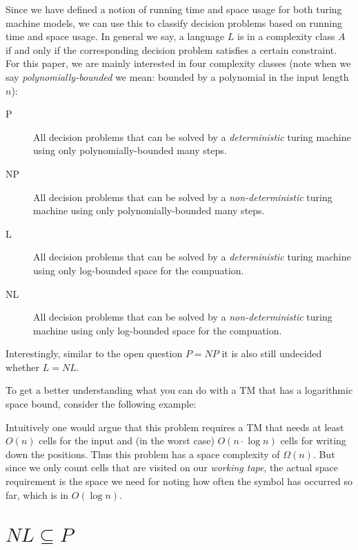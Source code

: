 Since we have defined a notion of running time and space usage for both
turing machine models, we can use this to classify decision problems
based on running time and space usage. In general we say, a language $L$
is in a complexity class $A$ if and only if the corresponding decision
problem satisfies a certain constraint. For this paper, we are mainly
interested in four complexity classes (note when we say
\emph{polynomially-bounded} we mean: bounded by a polynomial in the
input length $n$):

\begin{description}
\item[P]
All decision problems that can be solved by a \emph{deterministic}
turing machine using only polynomially-bounded many steps.
\item[NP]
All decision problems that can be solved by a \emph{non-deterministic}
turing machine using only polynomially-bounded many steps.
\item[L]
All decision problems that can be solved by a \emph{deterministic}
turing machine using only log-bounded space for the compuation.
\item[NL]
All decision problems that can be solved by a \emph{non-deterministic}
turing machine using only log-bounded space for the compuation.
\end{description}

Interestingly, similar to the open question $P = NP$ it is also still
undecided whether $L = NL$.

To get a better understanding what you can do with a TM that has a
logarithmic space bound, consider the following example:

\begin{description}
\itemsep1pt\parskip0pt
\item[Writing down all occurrences of a symbol in the input]
Intuitively one would argue that this problem requires a TM that needs
at least $O(n)$ cells for the input and (in the worst case)
$O(n \cdot \log n)$ cells for writing down the positions. Thus this
problem has a space complexity of $\Omega (n)$. But since we only count
cells that are visited on our \emph{working tape}, the actual space
requirement is the space we need for noting how often the symbol has
occurred so far, which is in $O(\log n)$.
\end{description}

\section{$NL \subseteq P$}\label{nl-subseteq-p}

